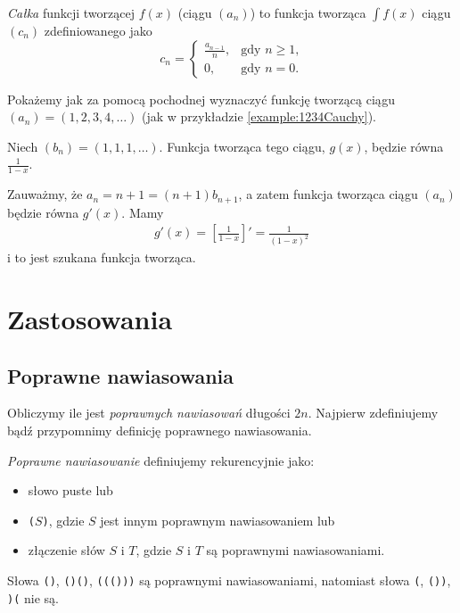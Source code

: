 \documentclass[shortabstract]{imthesis}
\begin{document}
\begin{definition}
    \emph{Całka} funkcji tworzącej $f(x)$ (ciągu $(a_n)$) to funkcja tworząca $\int f(x)$ ciągu $(c_n)$ zdefiniowanego jako 
    $$
    c_n = \begin{cases} \frac{a_{n-1}}{n}, &\text{gdy $n \geq 1$,} \\ 0, &\text{gdy $n = 0$.} \end{cases}
    $$
\end{definition}

\begin{example}
    Pokażemy jak za pomocą pochodnej wyznaczyć funkcję tworzącą ciągu $(a_n) = (1, 2, 3, 4, \ldots)$ (jak w przykładzie \ref{example:1234Cauchy}).
    
    Niech $(b_n) = (1, 1, 1, \ldots)$. Funkcja tworząca tego ciągu, $g(x)$, będzie równa $\frac{1}{1-x}$.

    Zauważmy, że $a_n = n+1 = (n+1)b_{n+1}$, a zatem funkcja tworząca ciągu $(a_n)$ będzie równa $g'(x)$. Mamy
    \begin{align*}
    g'(x) = \left[\frac{1}{1-x}\right]' = \frac{1}{(1-x)^2}
    \end{align*}
    i to jest szukana funkcja tworząca.
\end{example}

\section{Zastosowania}

\subsection{Poprawne nawiasowania}
    Obliczymy ile jest \emph{poprawnych nawiasowań} długości $2n$. Najpierw zdefiniujemy bądź przypomnimy definicję poprawnego nawiasowania.

    \begin{definition} \label{def:nawiasy}
    \emph{Poprawne nawiasowanie} definiujemy rekurencyjnie jako:
    \begin{itemize}
        \item słowo puste lub
        \item \texttt{(}$S$\texttt{)}, gdzie $S$ jest innym poprawnym nawiasowaniem lub
        \item złączenie słów $S$ i $T$, gdzie $S$ i $T$ są poprawnymi nawiasowaniami.
    \end{itemize}
    \end{definition}
    \begin{example}
        Słowa \texttt{()}, \texttt{()()}, \texttt{((()))} są poprawnymi nawiasowaniami, natomiast słowa \texttt{(}, \texttt{())}, \texttt{)(} nie są.
    \end{example}
\end{document}
